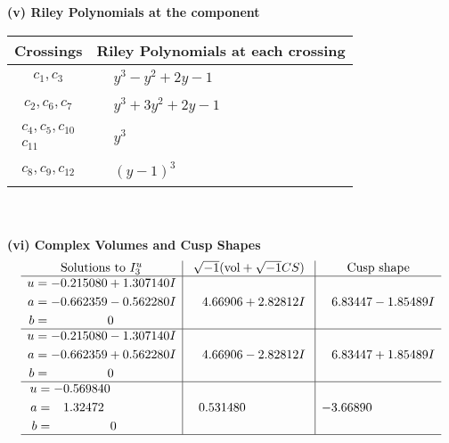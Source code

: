 \documentclass[1p]{elsarticle_modified}
\theoremstyle{definition}
\newcommand{\I}{\sqrt{-1}}
\begin{document}
\newpage\renewcommand{\arraystretch}{1}
\flushleft \textbf{(v) Riley Polynomials at the component}\newline \\
\begin{tabular}{m{50pt}|m{274pt}}
Crossings & \hspace{64pt}Riley Polynomials at each crossing \\
\hline $$\begin{aligned}c_{1},c_{3}\end{aligned}$$&$\begin{aligned}
&y^3- y^2+2 y-1
\end{aligned}$\\
\hline $$\begin{aligned}c_{2},c_{6},c_{7}\end{aligned}$$&$\begin{aligned}
&y^3+3 y^2+2 y-1
\end{aligned}$\\
\hline $$\begin{aligned}c_{4},c_{5},c_{10}\\c_{11}\end{aligned}$$&$\begin{aligned}
&y^3
\end{aligned}$\\
\hline $$\begin{aligned}c_{8},c_{9},c_{12}\end{aligned}$$&$\begin{aligned}
&(y-1)^3
\end{aligned}$\\
\hline
\end{tabular}\\~\\
\newpage\flushleft \textbf{(vi) Complex Volumes and Cusp Shapes}
$$\begin{array}{c|c|c}  
\text{Solutions to }I^u_{3}& \I (\text{vol} + \sqrt{-1}CS) & \text{Cusp shape}\\
 \hline 
\begin{aligned}
u &= -0.215080 + 1.307140 I \\
a &= -0.662359 - 0.562280 I \\
b &= \phantom{-0.000000 } 0\end{aligned}
 & \phantom{-}4.66906 + 2.82812 I & \phantom{-}6.83447 - 1.85489 I \\ \hline\begin{aligned}
u &= -0.215080 - 1.307140 I \\
a &= -0.662359 + 0.562280 I \\
b &= \phantom{-0.000000 } 0\end{aligned}
 & \phantom{-}4.66906 - 2.82812 I & \phantom{-}6.83447 + 1.85489 I \\ \hline\begin{aligned}
u &= -0.569840\phantom{ +0.000000I} \\
a &= \phantom{-}1.32472\phantom{ +0.000000I} \\
b &= \phantom{-0.000000 } 0\end{aligned}
 & \phantom{-}0.531480\phantom{ +0.000000I} & -3.66890\phantom{ +0.000000I}\\
 \hline 
 \end{array}$$\newpage
\end{document}

